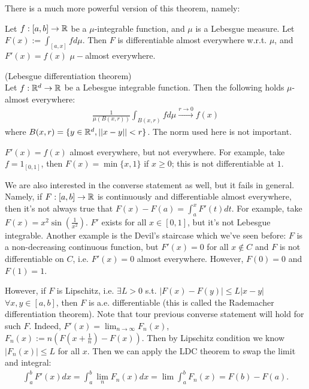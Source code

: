 \documentclass[a4paper]{article}
\begin{document}
\begin{rem}
There is a much more powerful version of this theorem, namely: 
\begin{thm}
Let $f:[a,b] \to \mathbb{R}$ be a $\mu$-integrable function, and $\mu$ is a Lebesgue measure. Let $F(x) := \int_{[a,x]} fd\mu$. Then $F$ is differentiable almost everywhere w.r.t. $\mu$, and $F'(x) = f(x)$ $\mu-$almost everywhere.
\end{thm}
\end{rem}

\begin{thm} (Lebesgue differentiation theorem)\\
Let $f:\mathbb{R}^d \to \mathbb{R}$ be a Lebesgue integrable function. Then the following holds $\mu$-almost everywhere:
\begin{equation*}
\begin{aligned}
\frac{1}{\mu(B(x,r))} \int_{B(x,r)} f d\mu \xrightarrow{r \to 0} f(x)
\end{aligned}
\end{equation*}
where $B(x,r) = \{y \in \mathbb{R}^d, ||x-y|| < r\}$. The norm used here is not important.
\end{thm}

\begin{rem}
$F'(x) = f(x)$ almost everywhere, but not everywhere. For example, take $f = 1_{[0,1]}$, then $F(x) = \min\{x,1\}$ if $x \geq 0$; this is not differentiable at $1$.

We are also interested in the converse statement as well, but it fails in general. Namely, if $F:[a,b] \to \mathbb{R}$ is continuously and differentiable almost everywhere, then it's not always true that $F(x) - F(a) = \int_a^x F'(t) dt$. For example, take $F(x) = x^2 \sin(\frac{1}{x^2})$. $F'$ exists for all $x \in [0,1]$, but it's not Lebesgue integrable. Another example is the Devil's staircase which we've seen before: $F$ is a non-decreasing continuous function, but $F'(x) = 0$ for all $x \not \in C$ and $F$ is not differentiable on $C$, i.e. $F'(x)=0$ almost everywhere. However, $F(0) = 0$ and $F(1) = 1$.
\end{rem}

\begin{rem}
However, if $F$ is Lipschitz, i.e. $\exists L > 0$ s.t. $|F(x) - F(y)| \leq L|x-y|$ $\forall x,y \in [a,b]$, then $F$ is a.e. differentiable (this is called the Rademacher differentiation theorem). Note that tour previous converse statement will hold for such $F$. Indeed, $F'(x) = \lim_{n \to \infty} F_n (x)$, $F_n(x) := n(F(x+\frac{1}{n}) - F(x))$. Then by Lipschitz condition we know $|F_n(x)| \leq L$ for all $x$. Then we can apply the LDC theorem to swap the limit and integral:
\begin{equation*}
\begin{aligned}
\int_a^b F'(x) dx = \int_a^b \lim_n F_n(x) dx = \lim \int_a^b F_n(x) = F(b) - F(a).
\end{aligned}
\end{equation*}
\end{rem}
\end{document}
